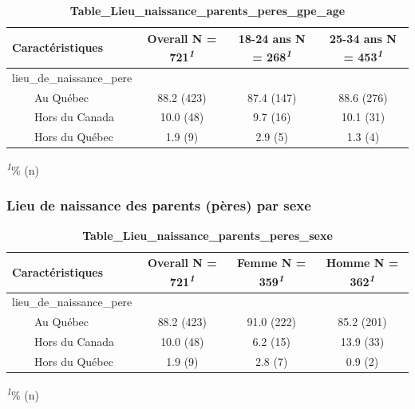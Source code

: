 \documentclass[
]{article}
\begin{document}
\newpage
\begin{table}[!t]
\caption{\label{tab:unnamed-chunk-32}\textbf{Table\_Lieu\_naissance\_parents\_peres\_gpe\_age}} 
\fontsize{12.0pt}{14.4pt}\selectfont
\begin{tabular*}{\linewidth}{@{\extracolsep{\fill}}lccc}
\toprule
\textbf{Caractéristiques} & \textbf{Overall}  N = 721\textsuperscript{\textit{1}} & \textbf{18-24 ans}  N = 268\textsuperscript{\textit{1}} & \textbf{25-34 ans}  N = 453\textsuperscript{\textit{1}} \\ 
\midrule\addlinespace[2.5pt]
lieu\_de\_naissance\_pere &  &  &  \\ 
    Au Québec & 88.2 (423) & 87.4 (147) & 88.6 (276) \\ 
    Hors du Canada & 10.0 (48) & 9.7 (16) & 10.1 (31) \\ 
    Hors du Québec & 1.9 (9) & 2.9 (5) & 1.3 (4) \\ 
\bottomrule
\end{tabular*}
\begin{minipage}{\linewidth}
\textsuperscript{\textit{1}}\% (n)\\
\end{minipage}
\end{table}

\vspace{1cm}

\hypertarget{lieu-de-naissance-des-parents-puxe8res-par-sexe}{%
\subsubsection{Lieu de naissance des parents (pères) par
sexe}\label{lieu-de-naissance-des-parents-puxe8res-par-sexe}}

\newpage
\begin{table}[!t]
\caption{\label{tab:unnamed-chunk-33}\textbf{Table\_Lieu\_naissance\_parents\_peres\_sexe}} 
\fontsize{12.0pt}{14.4pt}\selectfont
\begin{tabular*}{\linewidth}{@{\extracolsep{\fill}}lccc}
\toprule
\textbf{Caractéristiques} & \textbf{Overall}  N = 721\textsuperscript{\textit{1}} & \textbf{Femme}  N = 359\textsuperscript{\textit{1}} & \textbf{Homme}  N = 362\textsuperscript{\textit{1}} \\ 
\midrule\addlinespace[2.5pt]
lieu\_de\_naissance\_pere &  &  &  \\ 
    Au Québec & 88.2 (423) & 91.0 (222) & 85.2 (201) \\ 
    Hors du Canada & 10.0 (48) & 6.2 (15) & 13.9 (33) \\ 
    Hors du Québec & 1.9 (9) & 2.8 (7) & 0.9 (2) \\ 
\bottomrule
\end{tabular*}
\begin{minipage}{\linewidth}
\textsuperscript{\textit{1}}\% (n)\\
\end{minipage}
\end{table}
\vspace{2cm}
\end{document}
